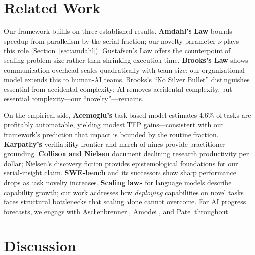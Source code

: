 \documentclass[11pt,a4paper]{article}
\begin{document}
\section{Related Work}
\label{sec:related}

Our framework builds on three established results. \textbf{Amdahl's Law} \citep{amdahl1967} bounds speedup from parallelism by the serial fraction; our novelty parameter $\nu$ plays this role (Section~\ref{sec:amdahl}). Gustafson's Law \citep{gustafson1988} offers the counterpoint of scaling problem size rather than shrinking execution time. \textbf{Brooks's Law} \citep{brooks1975} shows communication overhead scales quadratically with team size; our organizational model extends this to human-AI teams. Brooks's ``No Silver Bullet'' \citep{brooks1986} distinguishes essential from accidental complexity; AI removes accidental complexity, but essential complexity---our ``novelty''---remains.

On the empirical side, \textbf{Acemoglu's} task-based model \citep{acemoglu2024} estimates 4.6\% of tasks are profitably automatable, yielding modest TFP gains---consistent with our framework's prediction that impact is bounded by the routine fraction. \textbf{Karpathy's} verifiability frontier and march of nines \citep{karpathy2025verify} provide practitioner grounding. \textbf{Collison and Nielsen} \citep{collison2018} document declining research productivity per dollar; Nielsen's discovery fiction \citep{nielsen2024} provides epistemological foundations for our serial-insight claim. \textbf{SWE-bench} \citep{jimenez2024} and its successors show sharp performance drops as task novelty increases. \textbf{Scaling laws} for language models \citep{kaplan2020} describe capability growth; our work addresses how \emph{deploying} capabilities on novel tasks faces structural bottlenecks that scaling alone cannot overcome. For AI progress forecasts, we engage with Aschenbrenner \citep{aschenbrenner2024}, Amodei \citep{amodei2024}, and Patel \citep{patel2023} throughout.

\section{Discussion}
\label{sec:discussion}
\end{document}
